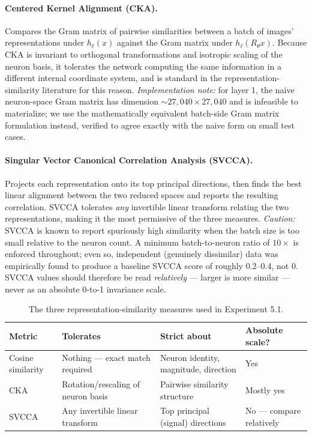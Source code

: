 \documentclass[11pt]{article}
\begin{document}
\paragraph{Centered Kernel Alignment (CKA).} Compares the Gram matrix of pairwise similarities
between a batch of images' representations under $h_\ell(x)$ against the Gram matrix under
$h_\ell(R_\theta x)$. Because CKA is invariant to orthogonal transformations and isotropic scaling of
the neuron basis, it tolerates the network computing the same information in a different internal
coordinate system, and is standard in the representation-similarity literature for this reason.
\emph{Implementation note:} for layer 1, the naive neuron-space Gram matrix has dimension
$\sim\!27{,}040 \times 27{,}040$ and is infeasible to materialize; we use the mathematically
equivalent batch-side Gram matrix formulation instead, verified to agree exactly with the naive form
on small test cases.

\paragraph{Singular Vector Canonical Correlation Analysis (SVCCA).} Projects each representation onto
its top principal directions, then finds the best linear alignment between the two reduced spaces and
reports the resulting correlation. SVCCA tolerates \emph{any} invertible linear transform relating
the two representations, making it the most permissive of the three measures. \emph{Caution:} SVCCA
is known to report spuriously high similarity when the batch size is too small relative to the neuron
count. A minimum batch-to-neuron ratio of $10\times$ is enforced throughout; even so, independent
(genuinely dissimilar) data was empirically found to produce a baseline SVCCA score of roughly
0.2--0.4, not 0. SVCCA values should therefore be read \emph{relatively} --- larger is more similar
--- never as an absolute 0-to-1 invariance scale.

\begin{table}[H]
\centering
\begin{tabular}{@{}p{2.6cm}p{3.6cm}p{4.2cm}p{2cm}@{}}
\toprule
\textbf{Metric} & \textbf{Tolerates} & \textbf{Strict about} & \textbf{Absolute scale?} \\
\midrule
Cosine similarity & Nothing --- exact match required & Neuron identity, magnitude, direction & Yes \\[4pt]
CKA & Rotation/rescaling of neuron basis & Pairwise similarity structure & Mostly yes \\[4pt]
SVCCA & Any invertible linear transform & Top principal (signal) directions & No --- compare relatively \\
\bottomrule
\end{tabular}
\caption{The three representation-similarity measures used in Experiment 5.1.}
\label{tab:metrics}
\end{table}
\end{document}
